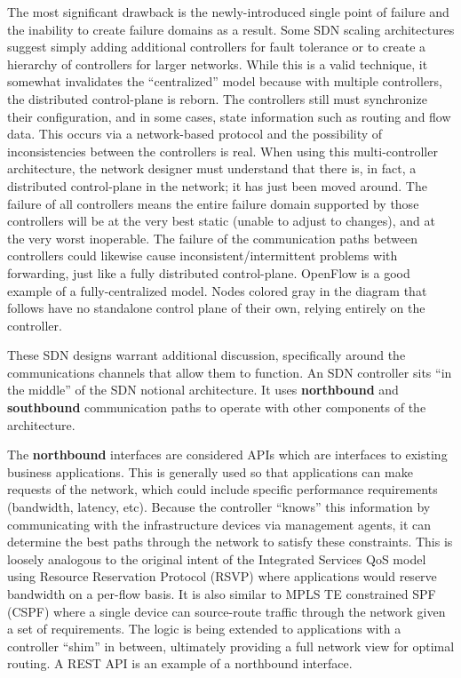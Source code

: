 \begin{enumerate}
  The most significant drawback is the newly-introduced single point of
  failure and the inability to create failure domains as a result. Some SDN
  scaling architectures suggest simply adding additional controllers for fault
  tolerance or to create a hierarchy of controllers for larger networks. While
  this is a valid technique, it somewhat invalidates the ``centralized'' model
  because with multiple controllers, the distributed control-plane is reborn.
  The controllers still must synchronize their configuration, and in some
  cases, state information such as routing and flow data. This occurs via a
  network-based protocol and the possibility of inconsistencies between the
  controllers is real. When using this multi-controller architecture, the
  network designer must understand that there is, in fact, a distributed
  control-plane in the network; it has just been moved around. The failure of
  all controllers means the entire failure domain supported by those
  controllers will be at the very best static (unable to adjust to changes),
  and at the very worst inoperable. The failure of the communication paths
  between controllers could likewise cause inconsistent/intermittent problems
  with forwarding, just like a fully distributed control-plane. OpenFlow is a
  good example of a fully-centralized model. Nodes colored gray in the diagram
  that follows have no standalone control plane of their own, relying
  entirely on the controller.

\end{enumerate}

These SDN designs warrant additional discussion, specifically around the
communications channels that allow them to function. An SDN controller sits
``in the middle'' of the SDN notional architecture. It uses \textbf{northbound}
and \textbf{southbound} communication paths to operate with other components
of the architecture.

The \textbf{northbound} interfaces are considered APIs which are interfaces to existing
business applications. This is generally used so that applications can make
requests of the network, which could include specific performance requirements
(bandwidth, latency, etc). Because the controller ``knows'' this information
by communicating with the infrastructure devices via management agents, it can
determine the best paths through the network to satisfy these constraints.
This is loosely analogous to the original intent of the Integrated Services
QoS model using Resource Reservation Protocol (RSVP) where applications would
reserve bandwidth on a per-flow basis. It is also similar to MPLS TE
constrained SPF (CSPF) where a single device can source-route traffic through
the network given a set of requirements. The logic is being extended to
applications with a controller ``shim'' in between, ultimately providing a
full network view for optimal routing. A REST API is an example of a
northbound interface.

